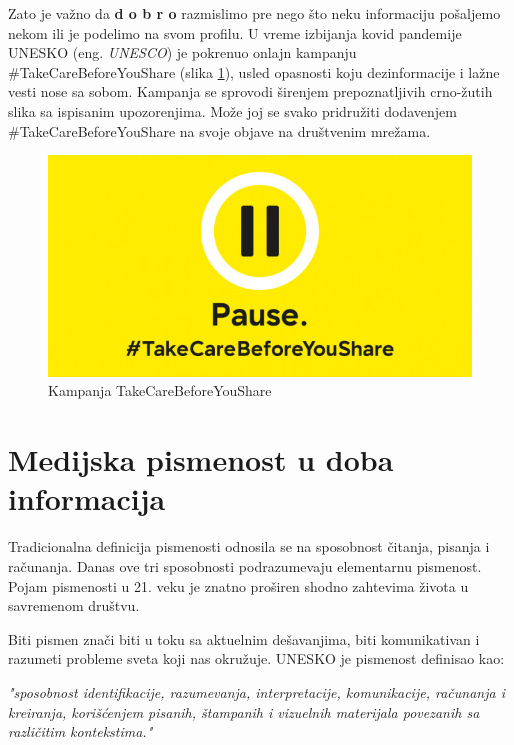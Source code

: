 \documentclass[a4paper]{article}
\begin{document}
Zato je važno da \textbf{d o b r o} razmislimo pre nego što neku informaciju 
pošaljemo nekom ili je podelimo na svom profilu. 
U vreme izbijanja kovid pandemije UNESKO (eng. \emph{UNESCO}) je pokrenuo onlajn kampanju \newline
\#TakeCareBeforeYouShare \cite{unesco kampanja} (slika \ref{fig:takecarebeforeyoushare}), usled opasnosti koju dezinformacije i lažne vesti nose sa sobom. Kampanja se sprovodi širenjem prepoznatljivih crno-žutih slika sa ispisanim upozorenjima. Može joj se svako pridružiti dodavenjem \#TakeCareBeforeYouShare na svoje objave na društvenim mrežama.

\begin{figure}[h!]
\begin{center}
\includegraphics[scale=0.4]{takecarebeforeyoushare.jpg}
\end{center}
\caption{Kampanja TakeCareBeforeYouShare}
\label{fig:takecarebeforeyoushare}
\end{figure}

\section{Medijska pismenost u doba informacija}
\label{sec:naslovN}

Tradicionalna definicija pismenosti odnosila se na sposobnost čitanja, pisanja i računanja. Danas ove tri sposobnosti podrazumevaju elementarnu pismenost. Pojam pismenosti u 21. veku je znatno proširen shodno zahtevima života u savremenom društvu.

Biti pismen znači biti u toku sa aktuelnim dešavanjima, biti komunikativan i razumeti probleme sveta koji nas okružuje. UNESKO je pismenost definisao kao:

\noindent \textit{"sposobnost identifikacije, razumevanja, interpretacije, komunikacije, računanja i kreiranja, korišćenjem pisanih, štampanih i vizuelnih materijala povezanih sa različitim kontekstima."}
\end{document}
